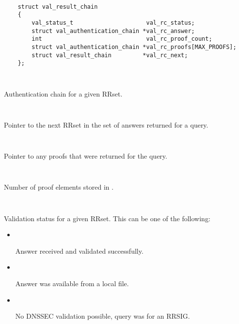 \begin{description}

\item {}\verb" "

\begin{verbatim}
    struct val_result_chain
    {
        val_status_t                     val_rc_status;
        struct val_authentication_chain *val_rc_answer;
        int                              val_rc_proof_count;
        struct val_authentication_chain *val_rc_proofs[MAX_PROOFS];
        struct val_result_chain         *val_rc_next;
    };
\end{verbatim}

\begin{description}

\item {}\verb" "

Authentication chain for a given RRset.

\item {}\verb" "

Pointer to the next RRset in the set of answers returned for a query.

\item {}\verb" "

Pointer to any proofs that were returned for the query.

\item {}\verb" "

Number of proof elements stored in .

\item {}\verb" "

Validation status for a given RRset.  This can be one of the following:

\begin{itemize}

\item {}\verb" "

Answer received and validated successfully.

\item {}\verb" "

Answer was available from a local file.

\item {}\verb" "

No DNSSEC validation possible, query was for an RRSIG.


\end{itemize}
\end{description}
\end{description}
